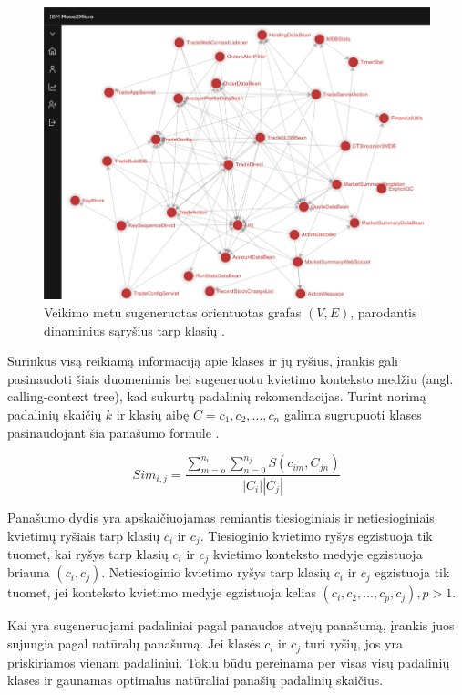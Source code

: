 \documentclass[fleqn]{VUMIFPSkursinis}
\begin{document}
\begin{figure}[H]
    \centering
    \includegraphics{img/mono-micro-grafas.png}
    \caption{Veikimo metu sugeneruotas orientuotas grafas $(V, E)$, parodantis dinaminius sąryšius tarp klasių \cite{KXL+20}.}
    \label{img:mono-micro-grafas}
\end{figure}

Surinkus visą reikiamą informaciją apie klases ir jų ryšius, įrankis gali pasinaudoti šiais duomenimis bei sugeneruotu kvietimo konteksto medžiu (angl. calling-context tree), kad sukurtų padalinių rekomendacijas. Turint norimą padalinių skaičių $k$ ir klasių aibę $C = {c_{1}, c_{2}, ..., c_{n}}$ galima sugrupuoti klases pasinaudojant šia panašumo formule \cite{KXL+20}.

\begin{equation}\label{eq:panasumo-formule}
    Sim_{i,j} = \frac{\sum_{m=o}^{n_{i}}\sum_{n=0}^{n_{j}}S(c_{im},C_{jn})}{\left| C_{i} \right|\left| C_{j} \right|}
\end{equation}

Panašumo dydis yra apskaičiuojamas remiantis tiesioginiais ir netiesioginiais kvietimų ryšiais tarp klasių $c_{i}$ ir $c_{j}$. Tiesioginio kvietimo ryšys egzistuoja tik tuomet, kai ryšys tarp klasių $c_{i}$ ir $c_{j}$ kvietimo konteksto medyje egzistuoja briauna $(c_{i}, c_{j})$. Netiesioginio kvietimo ryšys tarp klasių $c_{i}$ ir $c_{j}$ egzistuoja tik tuomet, jei konteksto kvietimo medyje egzistuoja kelias $(c_{i}, c_{2}, ..., c_{p}, c_{j}), p > 1$.

Kai yra sugeneruojami padaliniai pagal panaudos atvejų panašumą, įrankis juos sujungia pagal natūralų panašumą. Jei klasės $c_{i}$ ir $c_{j}$ turi ryšių, jos yra priskiriamos vienam padaliniui. Tokiu būdu pereinama per visas visų padalinių klases ir gaunamas optimalus natūraliai panašių padalinių skaičius.
\end{document}

